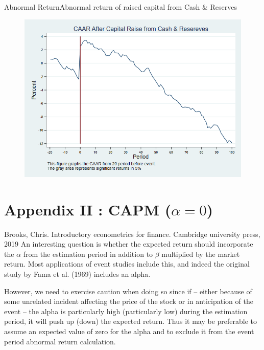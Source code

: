 \documentclass{beamer}
\begin{document}
\begin{frame}{Abnormal Return}{Abnormal return of raised capital from Cash \& Reserves}
\label{abreturnhybrid4Factor}
\begin{figure}
\centering
\includegraphics[width=0.65\linewidth]{AbReturnHybrid_4Factor}
\label{fig:abreturnhybrid2}
\end{figure}
\hfill\hyperlink{abreturnhybrid}{}
\end{frame}


\section{Appendix II : CAPM ($ \alpha = 0 $)}

\begin{frame}
\begin{block}{\footnotesize Brooks, Chris. Introductory econometrics for finance. Cambridge university press, 2019}
\scriptsize
An interesting question is whether the expected return should
incorporate the $ \alpha $ from the estimation period in addition to $ \beta $ multiplied by the market return.
 Most applications of event studies include this, and indeed the original study by Fama et al. (1969) includes an alpha.
 
However, we need to exercise caution when doing so since if – either
because of some unrelated incident affecting the price of the stock or in
anticipation of the event – the alpha is particularly high (particularly low) during the estimation period, it will push up (down) the expected return.
Thus it may be preferable to assume an expected value of zero for the
alpha and to exclude it from the event period abnormal return calculation.
\end{block}
\end{frame}
\end{document}
